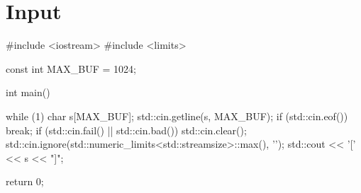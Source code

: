 \section{Input}
\begin{console}
#include <iostream> 
#include <limits> 

const int MAX_BUF = 1024; 

int main() 
{ 
    while (1) 
    { 
        char s[MAX_BUF]; 
        std::cin.getline(s, MAX_BUF); 
        if (std::cin.eof()) break; 
        if (std::cin.fail() || std::cin.bad()) 
        { 
            std::cin.clear(); 
            std::cin.ignore(std::numeric_limits<std::streamsize>::max(), 
                '\n');
        } 
        std::cout << '[' << s << "]\n"; 
    }

    return 0;
}
\end{console}
